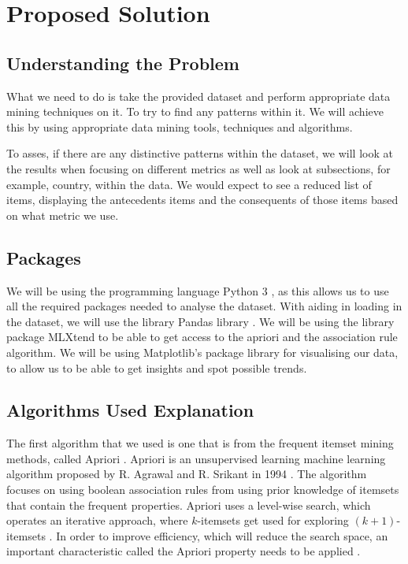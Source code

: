 \documentclass[a4paper,10pt]{article}
\begin{document}
\section{Proposed Solution}

\subsection{Understanding the Problem}

What we need to do is take the provided dataset and perform appropriate data mining techniques on it. To try to find any patterns within it. We will achieve this by using appropriate data mining tools, techniques and algorithms.

To asses, if there are any distinctive patterns within the dataset, we will look at the results when focusing on different metrics as well as look at subsections, for example, country, within the data. We would expect to see a reduced list of items, displaying the antecedents items and the consequents of those items based on what metric we use.

\subsection{Packages}

We will be using the programming language Python 3 \cite{Python}, as this allows us to use all the required packages needed to analyse the dataset. With aiding in loading in the dataset, we will use the library Pandas library \cite{mckinney-proc-scipy-2010}. We will be using the library package MLXtend\cite{raschkas_2018_mlxtend} to be able to get access to the apriori and the association rule algorithm. We will be using Matplotlib's \cite{hunter2007matplotlib} package library for visualising our data, to allow us to be able to get insights and spot possible trends.

\subsection{Algorithms Used Explanation}

The first algorithm that we used is one that is from the frequent itemset mining methods, called Apriori \cite{han2011data}. Apriori is an unsupervised learning machine learning algorithm proposed by R. Agrawal and R. Srikant in 1994 \cite{agrawal1994fast, geron2019hands}. The algorithm focuses on using boolean association rules \cite{agrawal1994fast} from using prior knowledge of itemsets that contain the frequent properties. Apriori uses a level-wise search, which operates an iterative approach, where $k$-itemsets get used for exploring $(k+1)$-itemsets \cite{jingjingslides}. In order to improve efficiency, which will reduce the search space, an important characteristic called the Apriori property needs to be applied \cite{han2011data}. 
\end{document}
